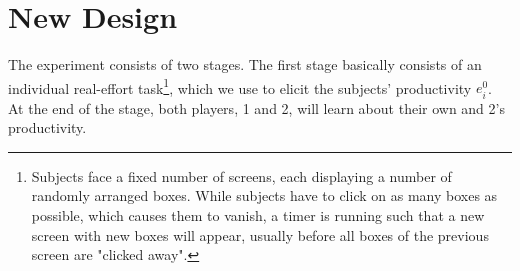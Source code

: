 



\section{New Design}
The experiment consists of two stages. The first stage basically consists of an individual real-effort task\footnote{Subjects face a fixed number of screens, each displaying a number of randomly arranged boxes. While subjects have to click on as many boxes as possible, which causes them to vanish, a timer is running such that a new screen with new boxes will appear, usually before all boxes of the previous screen are "clicked away".}, which we use to elicit the subjects' productivity $e^0_i$. At the end of the stage, both players, 1 and 2, will learn about their own and 2's productivity. %

